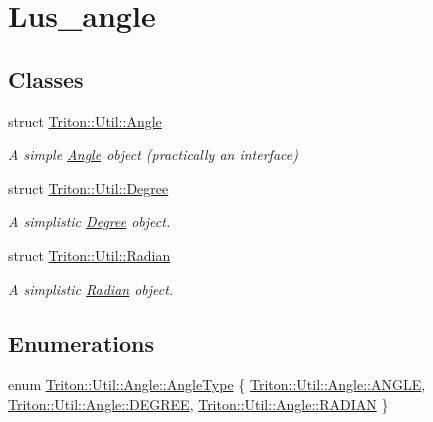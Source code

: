 \hypertarget{group__lus__angle}{}\section{Lus\+\_\+angle}
\label{group__lus__angle}
\subsection*{Classes}
\begin{DoxyCompactItemize}
\item 
struct \hyperlink{struct_triton_1_1_util_1_1_angle}{Triton\+::\+Util\+::\+Angle}
\begin{DoxyCompactList}\small\item\em A simple \hyperlink{struct_triton_1_1_util_1_1_angle}{Angle} object (practically an interface) \end{DoxyCompactList}\item 
struct \hyperlink{struct_triton_1_1_util_1_1_degree}{Triton\+::\+Util\+::\+Degree}
\begin{DoxyCompactList}\small\item\em A simplistic \hyperlink{struct_triton_1_1_util_1_1_degree}{Degree} object. \end{DoxyCompactList}\item 
struct \hyperlink{struct_triton_1_1_util_1_1_radian}{Triton\+::\+Util\+::\+Radian}
\begin{DoxyCompactList}\small\item\em A simplistic \hyperlink{struct_triton_1_1_util_1_1_radian}{Radian} object. \end{DoxyCompactList}\end{DoxyCompactItemize}
\subsection*{Enumerations}
\begin{DoxyCompactItemize}
\item 
enum \hyperlink{group__lus__angle_ga38b6255184f9399841fa0b1d6bc4aa78}{Triton\+::\+Util\+::\+Angle\+::\+Angle\+Type} \{ \hyperlink{group__lus__angle_gga38b6255184f9399841fa0b1d6bc4aa78ad5d37fcf38efdf957daee93ae0926788}{Triton\+::\+Util\+::\+Angle\+::\+A\+N\+G\+L\+E}, 
\hyperlink{group__lus__angle_gga38b6255184f9399841fa0b1d6bc4aa78a65f1c5d48e03bd1de5960ba56db879dd}{Triton\+::\+Util\+::\+Angle\+::\+D\+E\+G\+R\+E\+E}, 
\hyperlink{group__lus__angle_gga38b6255184f9399841fa0b1d6bc4aa78ada225beb0b39ac1224bf25804e15e08a}{Triton\+::\+Util\+::\+Angle\+::\+R\+A\+D\+I\+A\+N}
 \}
\end{DoxyCompactItemize}


